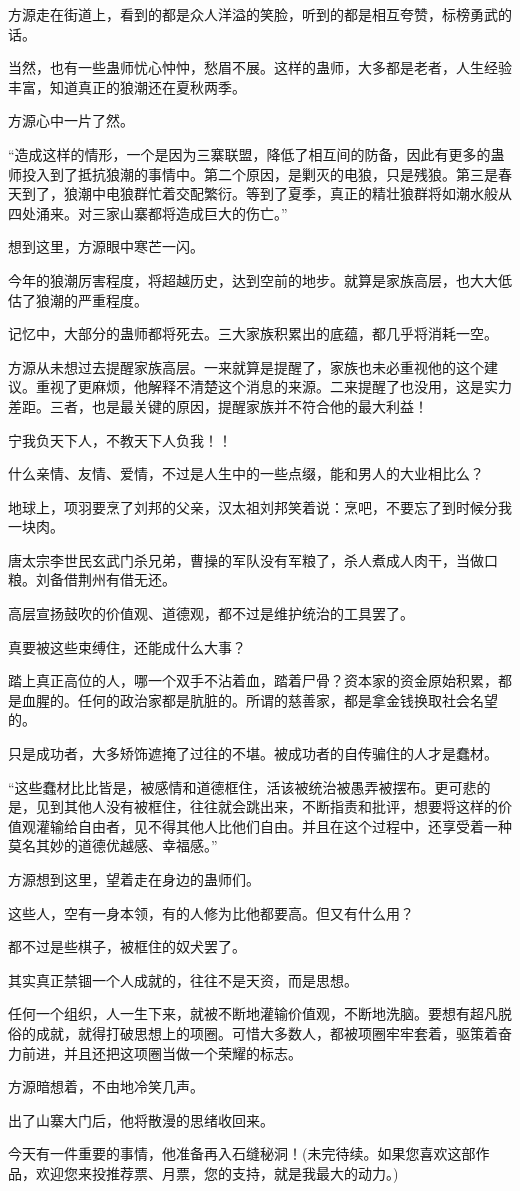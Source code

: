 \begin{this_body}
方源走在街道上，看到的都是众人洋溢的笑脸，听到的都是相互夸赞，标榜勇武的话。

当然，也有一些蛊师忧心忡忡，愁眉不展。这样的蛊师，大多都是老者，人生经验丰富，知道真正的狼潮还在夏秋两季。

方源心中一片了然。

“造成这样的情形，一个是因为三寨联盟，降低了相互间的防备，因此有更多的蛊师投入到了抵抗狼潮的事情中。第二个原因，是剿灭的电狼，只是残狼。第三是春天到了，狼潮中电狼群忙着交配繁衍。等到了夏季，真正的精壮狼群将如潮水般从四处涌来。对三家山寨都将造成巨大的伤亡。”

想到这里，方源眼中寒芒一闪。

今年的狼潮厉害程度，将超越历史，达到空前的地步。就算是家族高层，也大大低估了狼潮的严重程度。

记忆中，大部分的蛊师都将死去。三大家族积累出的底蕴，都几乎将消耗一空。

方源从未想过去提醒家族高层。一来就算是提醒了，家族也未必重视他的这个建议。重视了更麻烦，他解释不清楚这个消息的来源。二来提醒了也没用，这是实力差距。三者，也是最关键的原因，提醒家族并不符合他的最大利益！

宁我负天下人，不教天下人负我！！

什么亲情、友情、爱情，不过是人生中的一些点缀，能和男人的大业相比么？

地球上，项羽要烹了刘邦的父亲，汉太祖刘邦笑着说：烹吧，不要忘了到时候分我一块肉。

唐太宗李世民玄武门杀兄弟，曹操的军队没有军粮了，杀人煮成人肉干，当做口粮。刘备借荆州有借无还。

高层宣扬鼓吹的价值观、道德观，都不过是维护统治的工具罢了。

真要被这些束缚住，还能成什么大事？

踏上真正高位的人，哪一个双手不沾着血，踏着尸骨？资本家的资金原始积累，都是血腥的。任何的政治家都是肮脏的。所谓的慈善家，都是拿金钱换取社会名望的。

只是成功者，大多矫饰遮掩了过往的不堪。被成功者的自传骗住的人才是蠢材。

“这些蠢材比比皆是，被感情和道德框住，活该被统治被愚弄被摆布。更可悲的是，见到其他人没有被框住，往往就会跳出来，不断指责和批评，想要将这样的价值观灌输给自由者，见不得其他人比他们自由。并且在这个过程中，还享受着一种莫名其妙的道德优越感、幸福感。”

方源想到这里，望着走在身边的蛊师们。

这些人，空有一身本领，有的人修为比他都要高。但又有什么用？

都不过是些棋子，被框住的奴犬罢了。

其实真正禁锢一个人成就的，往往不是天资，而是思想。

任何一个组织，人一生下来，就被不断地灌输价值观，不断地洗脑。要想有超凡脱俗的成就，就得打破思想上的项圈。可惜大多数人，都被项圈牢牢套着，驱策着奋力前进，并且还把这项圈当做一个荣耀的标志。

方源暗想着，不由地冷笑几声。

出了山寨大门后，他将散漫的思绪收回来。

今天有一件重要的事情，他准备再入石缝秘洞！(未完待续。如果您喜欢这部作品，欢迎您来投推荐票、月票，您的支持，就是我最大的动力。)

\end{this_body}

